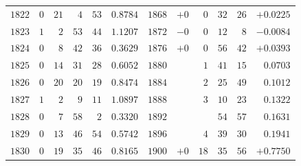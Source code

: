 \begin{center}
\begin{tabular}{r|rrrr|r||r|rrrr|r}
$1822$ & $0$ & $21$ & $4$ & $53$ & $0.8784$ & $1868$ & $+0$ & $0$ & $32$ & $26$ & $+0.0225$\\
$1823$ & $1$ & $2$ & $53$ & $44$ & $1.1207$ & $1872$ & $-0$ & $0$ & $12$ & $8$ & $-0.0084$\\
$1824$ & $0$ & $8$ & $42$ & $36$ & $0.3629$ & $1876$ & $+0$ & $0$ & $56$ & $42$ & $+0.0393$\\
$1825$ & $0$ & $14$ & $31$ & $28$ & $0.6052$ & $1880$ &  & $1$ & $41$ & $15$ & $0.0703$\\[3pt]
$1826$ & $0$ & $20$ & $20$ & $19$ & $0.8474$ & $1884$ &  & $2$ & $25$ & $49$ & $0.1012$\\
$1827$ & $1$ & $2$ & $9$ & $11$ & $1.0897$ & $1888$ &  & $3$ & $10$ & $23$ & $0.1322$\\
$1828$ & $0$ & $7$ & $58$ & $2$ & $0.3320$ & $1892$ &  &  & $54$ & $57$ & $0.1631$\\
$1829$ & $0$ & $13$ & $46$ & $54$ & $0.5742$ & $1896$ &  & $4$ & $39$ & $30$ & $0.1941$\\
$1830$ & $0$ & $19$ & $35$ & $46$ & $0.8165$ & $1900$ & $+0$ & $18$ & $35$ & $56$ & $+0.7750$\\
\end{tabular}
\endgroup
\end{center}
\clearpage
{}%
